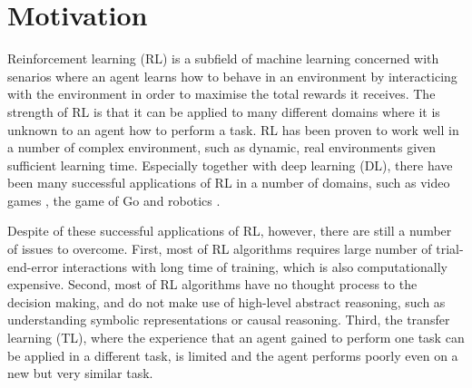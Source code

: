 \section{Motivation}
\label{sec:motivation}
Reinforcement learning (RL) is a subfield of machine learning concerned with senarios where an agent learns how to behave in an environment by interacticing with the environment in order to maximise the total rewards it receives.
The strength of RL is that it can be applied to many different domains where it is unknown to an agent how to perform a task. 
RL has been proven to work well in a number of complex environment, such as dynamic, real environments given sufficient learning time.
Especially together with deep learning (DL), there have been many successful applications of RL in a number of domains,
such as video games \cite{Mnih2015}, the game of Go \cite{Silver2016} and robotics \cite{Levine2015}. 

Despite of these successful applications of RL, however, there are still a number of issues to overcome.
First, most of RL algorithms requires large number of trial-end-error interactions with long time of training, which is also computationally expensive.
Second, most of RL algorithms have no thought process to the decision making, and do not make use of high-level abstract reasoning, 
such as understanding symbolic representations or causal reasoning.
Third, the transfer learning (TL), where the experience that an agent gained to perform one task can be applied in a different task, is limited and the agent performs poorly even on a new but very similar task. 

